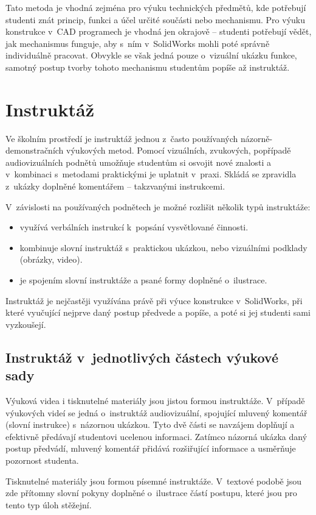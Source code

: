 Tato metoda je vhodná zejména pro výuku technických předmětů, kde potřebují studenti znát princip, funkci a účel určité součásti nebo mechanismu. 
Pro výuku konstrukce v~CAD programech je vhodná jen okrajově -- studenti potřebují vědět, jak mechanismus funguje, aby s~ním v~SolidWorks mohli poté správně individuálně pracovat.
Obvykle se však jedná pouze o~vizuální ukázku funkce, samotný postup tvorby tohoto mechanismu studentům popíše až instruktáž.

\section{Instruktáž}
Ve školním prostředí je instruktáž jednou z~často používaných názorně-demonstračních výukových metod.
Pomocí vizuálních, zvukových, popřípadě audiovizuálních podnětů umožňuje studentům si osvojit nové znalosti a v~kombinaci s~metodami praktickými je uplatnit v~praxi.
Skládá se zpravidla z~ukázky doplněné komentářem -- takzvanými instrukcemi.

\noindent V~závislosti na používaných podnětech je možné rozlišit několik typů instruktáže:
\begin{itemize}[topsep=0pt]
    \setlength\itemsep{0em}
    \item {} využívá verbálních instrukcí k~popsání vysvětlované činnosti.
    \item {} kombinuje slovní instruktáž s~praktickou ukázkou, nebo vizuálními podklady (obrázky, video).
    \item {} je spojením slovní instruktáže a psané formy doplněné o~ilustrace.
\end{itemize}

Instruktáž je nejčastěji využívána právě při výuce konstrukce v~SolidWorks, při které vyučující nejprve daný postup předvede a popíše, a poté si jej studenti sami vyzkoušejí.

\subsection{Instruktáž v~jednotlivých částech výukové sady}
Výuková videa i tisknutelné materiály jsou jistou formou instruktáže.
V~případě výukových videí se jedná o~instruktáž audiovizuální, spojující mluvený komentář (slovní instrukce) s~názornou ukázkou.
Tyto dvě části se navzájem doplňují a efektivně předávají studentovi ucelenou informaci.
Zatímco názorná ukázka daný postup předvádí, mluvený komentář přidává rozšiřující informace a usměrňuje pozornost studenta.

Tisknutelné materiály jsou formou písemné instruktáže.
V~textové podobě jsou zde přítomny slovní pokyny doplněné o~ilustrace částí postupu, které jsou pro tento typ úloh stěžejní.

\newpage